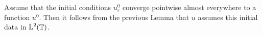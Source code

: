 \begin{remark}
	Assume that the initial conditions $ u_{ \varepsilon }^{ 0 } $ converge 
	pointwise almost everywhere to a function $ u^{ 0 } $. Then it follows from 
	the previous Lemma that $ u $ assumes this initial data in $ \operatorname{L}^{ 2 } ( 
	\operatorname{\mathbb{T}} ) $.
\end{remark}

